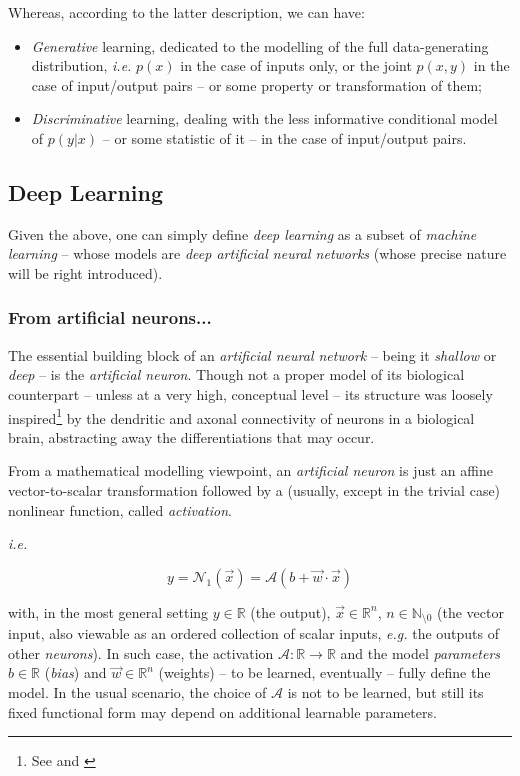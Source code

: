 Whereas, according to the latter description, we can have:
\begin{itemize}
    \item \textit{Generative} learning, dedicated to the modelling of the full data-generating distribution, \textit{i.e.} $p(x)$ in the case of inputs only, or the joint $p(x,y)$ in the case of input/output pairs -- or some property or transformation of them;
    \item \textit{Discriminative} learning, dealing with the less informative conditional model of $p(y|x)$ -- or some statistic of it -- in the case of input/output pairs.
\end{itemize}

\subsection{Deep Learning}

Given the above, one can simply define \textit{deep learning} as a subset of \textit{machine learning} -- whose models are \textit{deep artificial neural networks} (whose precise nature will be right introduced).

\subsubsection{From artificial neurons...}

The essential building block of an \textit{artificial neural network} -- being it \textit{shallow} or \textit{deep} -- is the \textit{artificial neuron}. Though not a proper model of its biological counterpart -- unless at a very high, conceptual level -- its structure was loosely inspired\footnote{See \cite{McCullochPitts1990ALC} and \cite{Rosenblatt1958ThePA}} by the dendritic and axonal connectivity of neurons in a biological brain, abstracting away the differentiations that may occur.

From a mathematical modelling viewpoint, an \textit{artificial neuron} is just an affine vector-to-scalar transformation followed by a (usually, except in the trivial case) nonlinear function, called \textit{activation}.

\textit{i.e.}

$$y = \mathcal{N}_1(\vec{x}) = \mathcal{A}(b + \vec{w} \cdot \vec{x})$$

with, in the most general setting $y \in \mathbb{R}$ (the output), $\vec{x} \in \mathbb{R}^n$, $n \in \mathbb{N}_{\setminus0}$ (the vector input, also viewable as an ordered collection of scalar inputs, \textit{e.g.} the outputs of other \textit{neurons}). In such case, the activation $\mathcal{A}: \mathbb{R} \rightarrow \mathbb{R}$ and the model \textit{parameters} $b \in \mathbb{R}$ (\textit{bias}) and $\vec{w} \in \mathbb{R}^n$ (weights) -- to be learned, eventually -- fully define the model. In the usual scenario, the choice of $\mathcal{A}$ is not to be learned, but still its fixed functional form may depend on additional learnable parameters.


